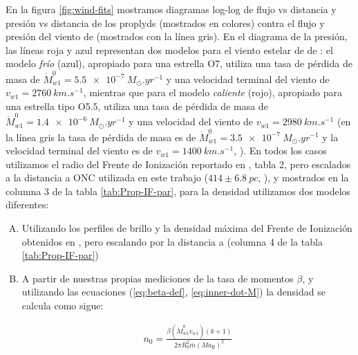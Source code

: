 En la figura \ref{fig:wind-fits} mostramos diagramas log-log de flujo vs distancia y presión vs distancia de los proplyds (mostrados en colores) contra el flujo y presión del viento de \thC{} (mostrados con la línea gris). En el diagrama de la presión, las líneas roja y azul representan dos modelos para el viento estelar de \thC{} de \citet{Gagne:2005}: el modelo \textit{frío} (azul), apropiado para una estrella O7, utiliza una tasa de pérdida de masa de $\dot{M}^0_{w1} = \SI{5.5e-7}{M_\odot.yr^{-1}}$ y una velocidad terminal del viento de $v_{w1} = \SI{2760}{km.s^{-1}}$, mientras que para el modelo \textit{caliente} (rojo), apropiado para una estrella tipo O5.5, utiliza una tasa de pérdida de masa de $\dot{M}^0_{w1} = \SI{1.4e-6}{M_\odot.yr^{-1}}$ y una velocidad del viento de $v_{w1} = \SI{2980}{km.s^{-1}}$ (en la línea gris la tasa de pérdida de masa es de $\dot{M}^0_{w1} = \SI{3.5e-7}{M_\odot.yr^{-1}}$ y la velocidad terminal del viento es de $v_{w1} = \SI{1400}{km.s^{-1}}$, \citet{GAH:2002}). En todos los casos utilizamos el radio del Frente de Ionización reportado en \citet{HA:1998}, tabla 2, pero escalados a la distancia a ONC utilizada en este trabajo ($414 \pm \SI{6.8}{pc}$, \citet{Menten:2007}), y mostrados en la columna 3 de la tabla \ref{tab:Prop-IF-par}, para la densidad utilizamos dos modelos diferentes:

\begin{enumerate}[A.]
\item Utilizando los perfiles de brillo y la densidad máxima del Frente de Ionización obtenidos en \citet{HA:1998}, pero escalando por la distancia a \thC{} (columna 4 de la tabla \ref{tab:Prop-IF-par})
\item A partir de nuestras propias mediciones de la tasa de momentos $\beta$, y utilizando las ecuaciones (\ref{eq:beta-def}, \ref{eq:inner-dot-M}) la densidad se calcula como sigue:

  \begin{align}
    n_0 = \frac{\beta\left(\dot{M}^0_{w1}v_{w1}\right)\left(k + 1\right)}{2\pi R^2_0 \bar{m}\left(M a_{\mathrm{II}}\right)^2} \label{eq:b-density}
  \end{align}
  
\end{enumerate}


